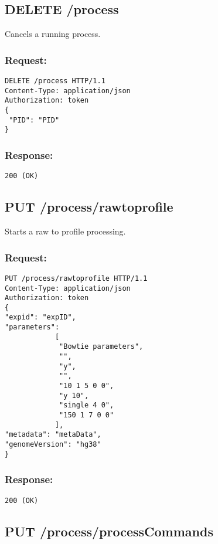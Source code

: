 \subsection*{DELETE /process}

Cancels a running process.

\subsubsection*{Request:}
\begin{verbatim}
DELETE /process HTTP/1.1
Content-Type: application/json
Authorization: token
{
 "PID": "PID"
}
\end{verbatim}

\subsubsection*{Response:}
\begin{verbatim}
200 (OK)
\end{verbatim}

\subsection*{PUT /process/rawtoprofile}

Starts a raw to profile processing.

\subsubsection*{Request:}
\begin{verbatim}
PUT /process/rawtoprofile HTTP/1.1
Content-Type: application/json
Authorization: token
{
"expid": "expID",
"parameters": 
            [
             "Bowtie parameters",
             "",
             "y",
             "",
             "10 1 5 0 0",
             "y 10",
             "single 4 0",
             "150 1 7 0 0"
            ],
"metadata": "metaData",
"genomeVersion": "hg38"
}
\end{verbatim}

\subsubsection*{Response:}
\begin{verbatim}
200 (OK)
\end{verbatim}

\subsection*{PUT /process/processCommands}


